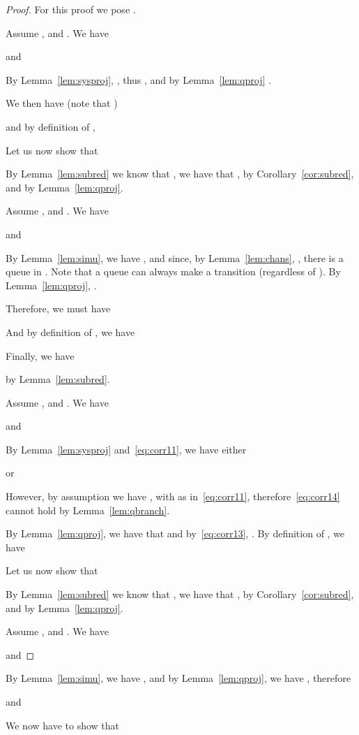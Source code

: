 \begin{proof}
For this proof we pose
.

Assume ,
 and
.
We have

and 

By Lemma~\ref{lem:sysproj}, ,
thus ,
and by Lemma~\ref{lem:qproj} .

We then have (note that )

and by definition of ,



Let us now show that

By Lemma~\ref{lem:subred} we know that ,
we have that
, by Corollary~\ref{cor:subred}, and
 by Lemma~\ref{lem:qproj}.

Assume ,  and 
. We have

and


By Lemma~\ref{lem:simu}, we have ,
and since, by Lemma~\ref{lem:chans}, , there is a queue  in . Note that a queue  can always make
a transition  (regardless of ).
By Lemma~\ref{lem:qproj}, .

Therefore, we must have


And by definition of , we have


Finally, we have

by Lemma~\ref{lem:subred}.

Assume ,
 and
.
We have

and 

By Lemma~\ref{lem:sysproj} and~\eqref{eq:corr11}, we have either

or

However, by assumption we have , with  as in~\eqref{eq:corr11},
therefore~\eqref{eq:corr14} cannot hold by Lemma~\ref{lem:qbranch}.

By Lemma~\ref{lem:qproj}, we have that 
and by~\eqref{eq:corr13}, .
By definition of , we have


Let us now show that

By Lemma~\ref{lem:subred} we know that ,
we have that
, by Corollary~\ref{cor:subred}, and
 by Lemma~\ref{lem:qproj}.

Assume ,  and 
. We have

and

\end{proof}
By Lemma~\ref{lem:simu}, we have ,
and by Lemma~\ref{lem:qproj}, we have ,
therefore

and 


We now have to show that


